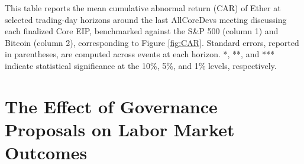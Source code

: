 \documentclass[No]{AEA}
\begin{document}
\begin{table}[ht!]
    \caption{Cumulative Abnormal Returns around AllCoreDevs Discussion of Finalized Core EIPs}
     \begin{small}
    \begin{minipage}{\textwidth}
      This table reports the mean cumulative abnormal return (CAR) of Ether at selected trading-day horizons around the last AllCoreDevs meeting discussing each finalized Core EIP, benchmarked against the S\&P 500 (column 1) and Bitcoin (column 2), corresponding to Figure \ref{fig:CAR}. Standard errors, reported in parentheses, are computed across events at each horizon. *, **, and *** indicate statistical significance at the 10\%, 5\%, and 1\% levels, respectively.
  \end{minipage}
         \end{small}
    \makebox[\textwidth][c]{}
    \label{tab:car_event_study}
\end{table}



\section{The Effect of Governance Proposals on Labor Market Outcomes} \label{sec:labor}
\end{document}
